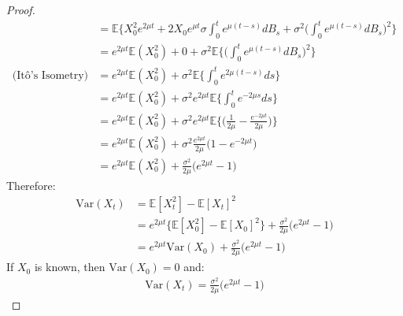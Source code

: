 \documentclass[11pt]{article}
\newcommand{\var}{\mrm{Var}}
\newcommand{\gs}{\sigma}
\newcommand{\mrm}{\mathrm}
\newcommand{\E}{\mathbb{E}}
\begin{document}
\begin{enumerate}
\begin{enumerate}
\begin{proof}
\begin{align*}
 &= \E \Big\{ X_0^2 e^{2\mu t} + 2 X_0 e^{\mu t}\gs \int_0^t e^{\mu (t-s)} dB_s+ \gs^2 \Big(\int_0^t e^{\mu (t-s)} dB_s\Big)^2 \Big\}\\
 &= e^{2 \mu t}\E(X_0^2) + 0 +\gs^2 \E \Big\{ \Big(\int_0^t e^{\mu (t-s)} dB_s \Big)^2 \Big\}\\
 \text{(It\^o's Isometry)} &=e^{2 \mu t}\E(X_0^2) + \gs^2 \E \Big\{ \int_0^t e^{2 \mu (t-s)}  ds\Big\}\\
 &= e^{2 \mu t}\E(X_0^2) + \gs^2 e^{2 \mu t}\E \Big\{ \int_0^t e^{-2\mu s} ds \Big\}\\
 &=e^{2 \mu t}\E(X_0^2) + \gs^2 e^{2 \mu t}\E \Big\{\Big( \frac{1}{2 \mu}-\frac{e^{-2 \mu t}}{2 \mu} \Big)\Big\}\\
 &=e^{2 \mu t}\E(X_0^2) + \gs^2 \frac{e^{2 \mu t}}{2 \mu} \Big( 1-e^{-2 \mu t} \Big)\\
 &= e^{2 \mu t}\E(X_0^2) + \frac{\gs^2}{2 \mu}\Big( e^{2 \mu t}-1 \Big)
 \end{align*}
 Therefore:
 \begin{align*}
 \var(X_t) &= \E[X_t^2] - \E[X_t]^2 \\ &= e^{2 \mu t} \big\{ \E[X_0^2]-\E[X_0]^2\big\}+ \frac{\gs^2}{2 \mu}\Big( e^{2 \mu t}-1 \Big)\\ &= e^{2 \mu t} \var(X_0) +\frac{\gs^2}{2 \mu}\Big( e^{2 \mu t}-1 \Big)
 \end{align*}
 If $X_0$ is known, then $\var(X_0)=0$ and:
 \begin{align*}
  \var(X_t) =\frac{\gs^2}{2 \mu}\Big( e^{2 \mu t}-1 \Big)
 \end{align*}
 \end{proof}
\end{enumerate}
 \end{enumerate}
\end{document}
